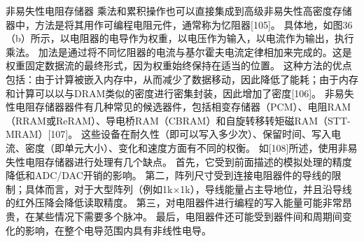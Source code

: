非易失性电阻存储器
乘法和累积操作也可以直接集成到高级非易失性高密度存储器中，方法是将其用作可编程电阻元件，通常称为忆阻器[105]。
具体地，如图36（b）所示，以电阻器的电导作为权重，以电压作为输入，以电流作为输出，执行乘法。
加法是通过将不同忆阻器的电流与基尔霍夫电流定律相加来完成的。这是权重固定数据流的最终形式，因为权重始终保持在适当的位置。
这种方法的优点包括：由于计算被嵌入内存中，从而减少了数据移动，因此降低了能耗；由于内存和计算可以以与DRAM类似的密度进行密集封装，因此增加了密度[106]。
非易失性电阻存储器器件有几种常见的候选器件，包括相变存储器（PCM）、电阻RAM（RRAM或ReRAM）、导电桥RAM（CBRAM）和自旋转移转矩磁RAM（STT-MRAM）[107]。
这些设备在耐久性（即可以写入多少次）、保留时间、写入电流、密度（即单元大小）、变化和速度方面有不同的权衡。
如[108]所述，使用非易失性电阻存储器进行处理有几个缺点。
首先，它受到前面描述的模拟处理的精度降低和ADC/DAC开销的影响。
第二，阵列尺寸受到连接电阻器件的导线的限制；具体而言，对于大型阵列（例如1k×1k），导线能量占主导地位，并且沿导线的红外压降会降低读取精度。
第三，对电阻器件进行编程的写入能量可能非常昂贵，在某些情况下需要多个脉冲。
最后，电阻器件还可能受到器件间和周期间变化的影响，在整个电导范围内具有非线性电导。


